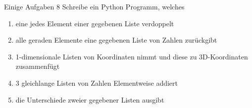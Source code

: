 \begin{frame}{Einige Aufgaben 8}
	Schreibe ein Python Programm, welches
	\begin{enumerate}
		\item eine jedes Element einer gegebenen Liste verdoppelt
		\item alle geraden Elemente eine gegebenen Liste von Zahlen zurückgibt
		\item 1-dimensionale Listen von Koordinaten nimmt und diese zu 3D-Koordinaten zusammenfügt
		\item 3 gleichlange Listen von Zahlen Elementweise addiert
		\item die Unterschiede zweier gegebener Listen ausgibt
	\end{enumerate}
\end{frame}






